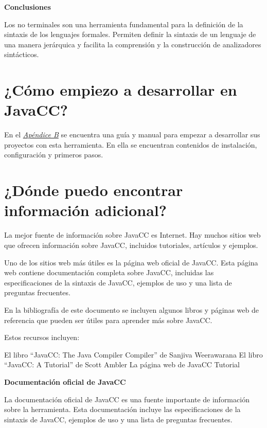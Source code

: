 \textbf{Conclusiones}

Los no terminales son una herramienta fundamental para la definición de la sintaxis de los lenguajes formales. Permiten definir la sintaxis de un lenguaje de una manera jerárquica y facilita la comprensión y la construcción de analizadores sintácticos.

\section{¿Cómo empiezo a desarrollar en JavaCC?}

En el \hyperref[sec:instalaciondejavacc]{\textit{Apéndice B}} se encuentra una guía y manual para empezar a desarrollar sus proyectos con esta herramienta. En ella se encuentran contenidos de instalación, configuración y primeros pasos.


\section{¿Dónde puedo encontrar información adicional?}

La mejor fuente de información sobre JavaCC es Internet. Hay muchos sitios web que ofrecen información sobre JavaCC, incluidos tutoriales, artículos y ejemplos.

Uno de los sitios web más útiles es la página web oficial de JavaCC. Esta página web contiene documentación completa sobre JavaCC, incluidas las especificaciones de la sintaxis de JavaCC, ejemplos de uso y una lista de preguntas frecuentes.

En la bibliografía de este documento se incluyen algunos libros y páginas web de referencia que pueden ser útiles para aprender más sobre JavaCC.

Estos recursos incluyen:

    El libro ``JavaCC: The Java Compiler Compiler'' de Sanjiva Weerawarana
    El libro ``JavaCC: A Tutorial'' de Scott Ambler
    La página web de JavaCC Tutorial

\textbf{Documentación oficial de JavaCC}

La documentación oficial de JavaCC es una fuente importante de información sobre la herramienta. Esta documentación incluye las especificaciones de la sintaxis de JavaCC, ejemplos de uso y una lista de preguntas frecuentes.
